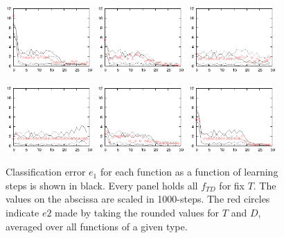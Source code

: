 \documentclass[useAMS,usenatbib]{templates/mn2e}
\begin{document}
\begin{figure}
  \begin{center}
   \includegraphics[width=0.3\textwidth]{fig/err/e1.eps}
   \includegraphics[width=0.3\textwidth]{fig/err/e2.eps}
   \includegraphics[width=0.3\textwidth]{fig/err/e3.eps}
  \end{center}
  \begin{center}
   \includegraphics[width=0.3\textwidth]{fig/err/e4.eps}
   \includegraphics[width=0.3\textwidth]{fig/err/e5.eps}
   \includegraphics[width=0.3\textwidth]{fig/err/e6.eps}
  \end{center}
  \caption{\label{fig:e12nit}Classification error $e_1$ for each
    function as a function of learning steps is shown in black. Every
    panel holds all $f_{TD}$ for fix $T$. The values on the abscissa
    are scaled in 1000-steps. The red circles indicate $e2$ made by
    taking the rounded values for $T$ and $D$, averaged over all
    functions of a given type.}
\end{figure}
\end{document}
